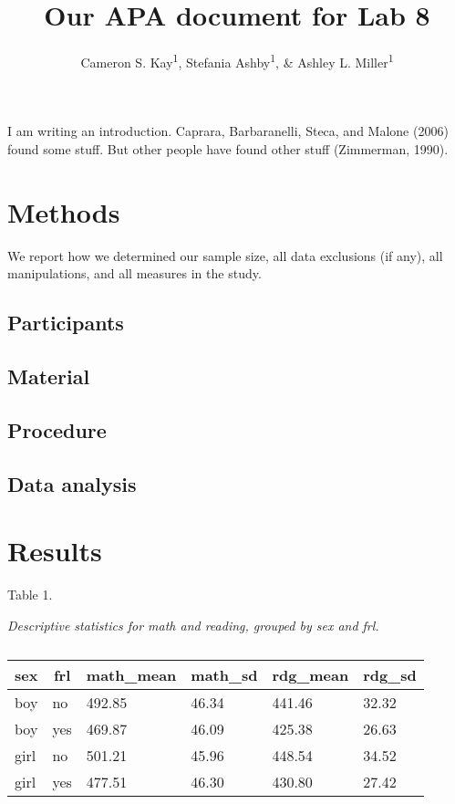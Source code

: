 \documentclass[man]{apa6}
\title{Our APA document for Lab 8}
\author{Cameron S. Kay\textsuperscript{1}, Stefania Ashby\textsuperscript{1}, \&
Ashley L. Miller\textsuperscript{1}}
\date{}
\affiliation{
\vspace{0.5cm}
\textsuperscript{1} University of Oregon}
\begin{document}
\maketitle

I am writing an introduction. Caprara, Barbaranelli, Steca, and Malone
(2006) found some stuff. But other people have found other stuff
(Zimmerman, 1990).

\section{Methods}\label{methods}

We report how we determined our sample size, all data exclusions (if
any), all manipulations, and all measures in the study.

\subsection{Participants}\label{participants}

\subsection{Material}\label{material}

\subsection{Procedure}\label{procedure}

\subsection{Data analysis}\label{data-analysis}

\section{Results}\label{results}

Table 1.

\emph{Descriptive statistics for math and reading, grouped by sex and
frl.}

\begin{table}[tbp]
\begin{center}
\begin{threeparttable}
\caption{\label{tab:create_table}}
\begin{tabular}{llllll}
\toprule
sex & \multicolumn{1}{c}{frl} & \multicolumn{1}{c}{math\_mean} & \multicolumn{1}{c}{math\_sd} & \multicolumn{1}{c}{rdg\_mean} & \multicolumn{1}{c}{rdg\_sd}\\
\midrule
boy & no & 492.85 & 46.34 & 441.46 & 32.32\\
boy & yes & 469.87 & 46.09 & 425.38 & 26.63\\
girl & no & 501.21 & 45.96 & 448.54 & 34.52\\
girl & yes & 477.51 & 46.30 & 430.80 & 27.42\\
\bottomrule
\end{tabular}
\end{threeparttable}
\end{center}
\end{table}
\end{document}
